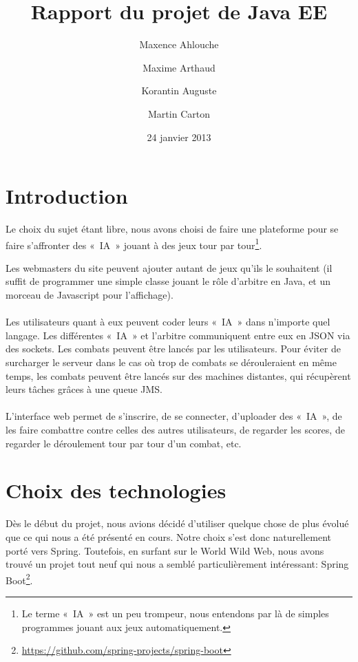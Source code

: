 \documentclass[10pt]{scrartcl}
\begin{document}
\title{Rapport du projet de Java EE}
\author{Maxence Ahlouche \and Maxime Arthaud \and Korantin Auguste \and Martin Carton}

\date{24 janvier 2013}
\maketitle

\section{Introduction}
  Le choix du sujet étant libre, nous avons choisi de faire une plateforme pour
  se faire s'affronter des «~IA~» jouant à des jeux tour par tour\footnote{Le
  terme «~IA~» est un peu trompeur, nous entendons par là de simples programmes
  jouant aux jeux automatiquement.}.

  Les webmasters du site peuvent ajouter autant de jeux qu'ils le souhaitent
  (il suffit de programmer une simple classe jouant le rôle d'arbitre en Java,
  et un morceau de Javascript pour l'affichage).

  \paragraph{}
  Les utilisateurs quant à eux peuvent coder leurs «~IA~» dans n'importe quel
  langage. Les différentes «~IA~» et l'arbitre communiquent entre eux en JSON
  via des sockets. Les combats peuvent être lancés par les utilisateurs. Pour éviter
  de surcharger le serveur dans le cas où trop de combats se dérouleraient en
  même temps, les combats peuvent être lancés sur des machines distantes, qui
  récupèrent leurs tâches grâces à une queue JMS.

  \paragraph{}
  L'interface web permet de s'inscrire, de se connecter, d'uploader des «~IA~»,
  de les faire combattre contre celles des autres utilisateurs, de regarder les
  scores, de regarder le déroulement tour par tour d'un combat, etc.

\section{Choix des technologies}
  Dès le début du projet, nous avions décidé d'utiliser quelque chose
  de plus évolué que ce qui nous a été présenté en cours. Notre choix
  s'est donc naturellement porté vers Spring. Toutefois, en surfant
  sur le World Wild Web, nous avons trouvé un projet tout neuf qui
  nous a semblé particulièrement intéressant: Spring
  Boot\footnote{\url{https://github.com/spring-projects/spring-boot}}.
\end{document}
